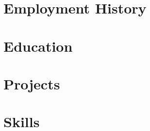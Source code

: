 \documentclass[9pt]{resume}
\begin{document}
\maketitle

\section{Employment History}










\section{Education}




\section{Projects}













\section{Skills}










\end{document}
